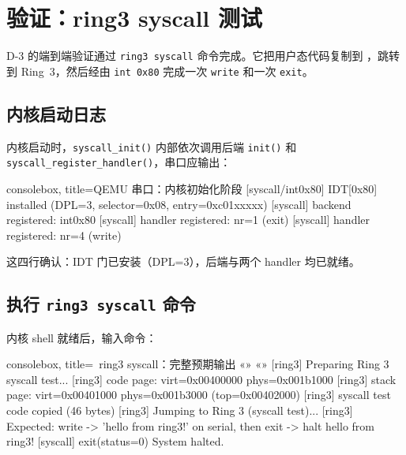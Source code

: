 \section{验证：ring3 syscall 测试}
\label{sec:int80-verify}

D-3 的端到端验证通过 \texttt{ring3 syscall} 命令完成。它把用户态代码复制到
，跳转到 Ring~3，然后经由 \texttt{int 0x80} 完成一次 \texttt{write}
和一次 \texttt{exit}。

\subsection{内核启动日志}

内核启动时，\texttt{syscall\_init()} 内部依次调用后端 \texttt{init()}
和 \texttt{syscall\_register\_handler()}，串口应输出：

\begin{tcblisting}{consolebox, title={QEMU 串口：内核初始化阶段}}
[syscall/int0x80] IDT[0x80] installed (DPL=3, selector=0x08, entry=0xc01xxxxx)
[syscall] backend registered: int0x80
[syscall] handler registered: nr=1 (exit)
[syscall] handler registered: nr=4 (write)
\end{tcblisting}

这四行确认：IDT 门已安装（DPL=3），后端与两个 handler 均已就绪。

\subsection{执行 \texttt{ring3 syscall} 命令}

内核 shell 就绪后，输入命令：

\begin{tcblisting}{consolebox, title={\tpk{>}~ring3 syscall：完整预期输出}}
«» «»
[ring3] Preparing Ring 3 syscall test...
[ring3] code page: virt=0x00400000 phys=0x001b1000
[ring3] stack page: virt=0x00401000 phys=0x001b3000 (top=0x00402000)
[ring3] syscall test code copied (46 bytes)
[ring3] Jumping to Ring 3 (syscall test)...
[ring3] Expected: write -> 'hello from ring3!' on serial, then exit -> halt
hello from ring3!
[syscall] exit(status=0)
System halted.
\end{tcblisting}

